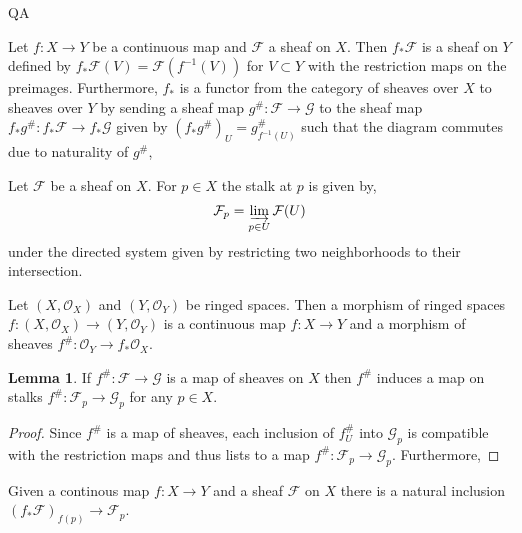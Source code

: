 QA	 \documentclass[12pt]{extarticle}
\theoremstyle{definition}
\newtheorem{lemma}[theorem]{Lemma}
\newenvironment{definition}[1][Definition:]{\begin{trivlist}
\item[\hskip \labelsep {\bfseries #1}]}{\end{trivlist}}
\newcommand{\res}{\mathrm{res}}
\newcommand{\F}{\mathcal{F}}
\newcommand{\G}{\mathcal{G}}
\renewcommand{\O}{\mathcal{O}}
\begin{document}
\begin{definition}
Let $f : X \to Y$ be a continuous map and $\F$ a sheaf on $X$. Then $f_* \F$ is a sheaf on $Y$ defined by $f_* \F(V) = \F(f^{-1}(V))$ for $V \subset Y$ with the restriction maps on the preimages. Furthermore, $f_*$ is a functor from the category of sheaves over $X$ to sheaves over $Y$ by sending a sheaf map $g^{\#} : \F \to \G$ to the sheaf map $f_* g^{\#} : f_* \F \to f_* \G$ given by $(f_* g^{\#})_U = g^{\#}_{f^{-1}(U)}$ such that the diagram commutes due to naturality of $g^{\#}$,
\begin{center}
\end{center}   
\end{definition}

\begin{definition}
Let $\F$ be a sheaf on $X$. For $p \in X$ the stalk at $p$ is given by,
\[ \F_p = \varinjlim_{p \in U} \F(U) \]
under the directed system given by restricting two neighborhoods to their intersection. 
\end{definition}

\begin{definition}
Let $(X, \O_X)$ and $(Y, \O_Y)$ be ringed spaces. Then a morphism of ringed spaces $f : (X, \O_X) \to (Y, \O_Y)$ is a continuous map $f : X \to Y$ and a morphism of sheaves $f^{\#} : \O_Y \to f_* \O_X$. 
\end{definition}

\begin{lemma}
If $f^{\#} : \F \to \G$ is a map of sheaves on $X$ then $f^{\#}$ induces a map on stalks $f^{\#} : \F_p \to \G_p$ for any $p \in X$. 
\end{lemma}

\begin{proof}
Since $f^{\#}$ is a map of sheaves, each inclusion of $f^{\#}_U$ into $\G_p$ is compatible with the restriction maps and thus lists to a map $f^{\#} : \F_p \to \G_p$. Furthermore, 
\end{proof}

\begin{definition}
Given a continous map $f : X \to Y$ and a sheaf $\F$ on $X$ there is a natural inclusion $(f_* \F)_{f(p)} \to \F_{p}$. 
\end{definition}
\end{document}
